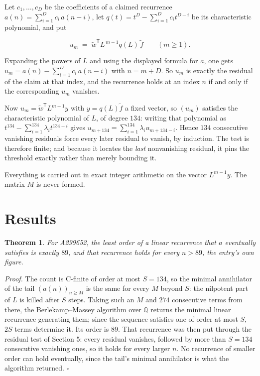 \documentclass[11pt]{article}
\newtheorem{theorem}{Theorem}
\theoremstyle{definition}
\begin{document}
Let $c_1,\dots,c_D$ be the coefficients of a claimed recurrence $a(n) = \sum_{i=1}^{D} c_i\,a(n-i)$, let $q(t) = t^{D} - \sum_{i=1}^{D} c_i t^{D-i}$ be its characteristic polynomial, and put

\[u_m \;=\; \tilde w^{\mathsf T} L^{\,m-1} q(L)\,\tilde f \qquad (m \ge 1).\]

Expanding the powers of $L$ and using the displayed formula for $a$, one gets $u_m = a(n) - \sum_{i=1}^{D} c_i\,a(n-i)$ with $n = m + D$. So $u_m$ is exactly the residual of the claim at that index, and the recurrence holds at an index $n$ if and only if the corresponding $u_m$ vanishes.

Now $u_m = \tilde w^{\mathsf T} L^{m-1} y$ with $y = q(L)\tilde f$ a fixed vector, so $(u_m)$ satisfies the characteristic polynomial of $L$, of degree $134$: writing that polynomial as $t^{134} - \sum_{i=1}^{134} \lambda_i t^{134-i}$ gives $u_{m+134} = \sum_{i=1}^{134} \lambda_i u_{m+134-i}$. Hence $134$ consecutive vanishing residuals force every later residual to vanish, by induction. The test is therefore finite; and because it locates the {\itshape last} nonvanishing residual, it pins the threshold exactly rather than merely bounding it.

Everything is carried out in exact integer arithmetic on the vector $L^{m-1}y$. The matrix $M$ is never formed.

\section{Results}

\begin{theorem} For A299652, the least order of a linear recurrence that $a$ eventually satisfies is exactly $89$, and that recurrence holds for every $n > 89$, the entry's own figure.\end{theorem}

{\itshape Proof.} The count is C-finite of order at most $S = 134$, so the minimal annihilator of the tail $(a(n))_{n \ge M}$ is the same for every $M$ beyond $S$: the nilpotent part of $L$ is killed after $S$ steps. Taking such an $M$ and $274$ consecutive terms from there, the Berlekamp--Massey algorithm over $\mathbb{Q}$ returns the minimal linear recurrence generating them; since the sequence satisfies one of order at most $S$, $2S$ terms determine it. Its order is $89$. That recurrence was then put through the residual test of Section 5: every residual vanishes, followed by more than $S = 134$ consecutive vanishing ones, so it holds for every larger $n$. No recurrence of smaller order can hold eventually, since the tail's minimal annihilator is what the algorithm returned. $\square$
\end{document}
